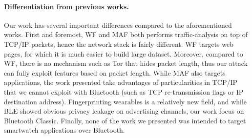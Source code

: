\paragraph{Differentiation from previous works.} Our work has several important differences compared to the aforementioned works. First and foremost, WF and MAF both performs traffic-analysis on top of TCP/IP packets, hence the network stack is fairly different. WF targets web pages, for which it is much easier to build large dataset. Moreover, compared to WF, there is no mechanism such as Tor that hides packet length, thus our attack can fully exploit features based on packet length. While MAF also targets applications, the work presented take advantages of particularities in TCP/IP that we cannot exploit with Bluetooth (such as TCP re-transmission flags or IP destination address). Fingerprinting wearables is a relatively new field, and while BLE showed obvious privacy leakage on advertising channels, our work focus on Bluetooth Classic. Finally, none of the work we presented was intended to target smartwatch applications over Bluetooth. 



